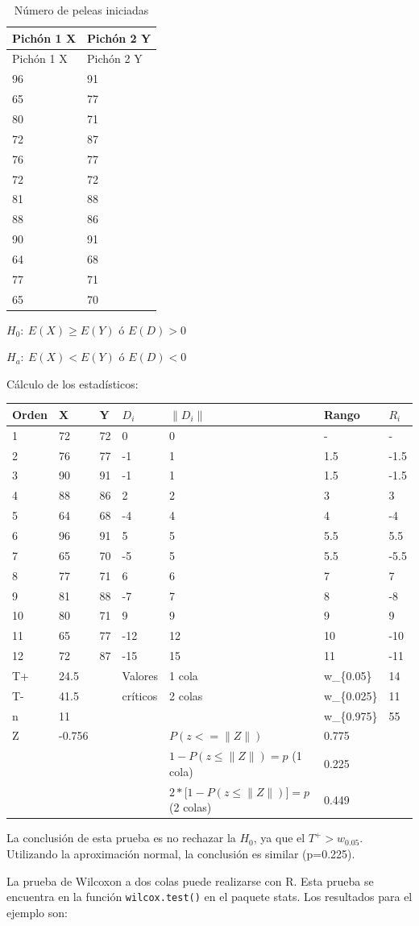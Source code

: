 \documentclass[]{book}
\theoremstyle{definition}
\theoremstyle{definition}
\theoremstyle{definition}
\theoremstyle{remark}
\begin{document}
\begin{longtable}[]{@{}ll@{}}
\caption{\label{tab:peleas} Número de peleas iniciadas}\tabularnewline
\toprule
Pichón 1 X & Pichón 2 Y\tabularnewline
\midrule
\endfirsthead
\toprule
Pichón 1 X & Pichón 2 Y\tabularnewline
\midrule
\endhead
96 & 91\tabularnewline
65 & 77\tabularnewline
80 & 71\tabularnewline
72 & 87\tabularnewline
76 & 77\tabularnewline
72 & 72\tabularnewline
81 & 88\tabularnewline
88 & 86\tabularnewline
90 & 91\tabularnewline
64 & 68\tabularnewline
77 & 71\tabularnewline
65 & 70\tabularnewline
\bottomrule
\end{longtable}

\(H_{0}:\ E\left( X \right) \geq E(Y)\) ó \(E\left( D \right) > 0\)

\(H_{a}:\ E\left( X \right) < E(Y)\) ó \(E\left( D \right) < 0\)

Cálculo de los estadísticos:

\begin{longtable}[]{@{}lllllll@{}}
\toprule
Orden & X & Y & \(D_{i}\) & \(\|D_{i}\|\) & Rango &
\(R_{i}\)\tabularnewline
\midrule
\endhead
1 & 72 & 72 & 0 & 0 & - & -\tabularnewline
2 & 76 & 77 & -1 & 1 & 1.5 & -1.5\tabularnewline
3 & 90 & 91 & -1 & 1 & 1.5 & -1.5\tabularnewline
4 & 88 & 86 & 2 & 2 & 3 & 3\tabularnewline
5 & 64 & 68 & -4 & 4 & 4 & -4\tabularnewline
6 & 96 & 91 & 5 & 5 & 5.5 & 5.5\tabularnewline
7 & 65 & 70 & -5 & 5 & 5.5 & -5.5\tabularnewline
8 & 77 & 71 & 6 & 6 & 7 & 7\tabularnewline
9 & 81 & 88 & -7 & 7 & 8 & -8\tabularnewline
10 & 80 & 71 & 9 & 9 & 9 & 9\tabularnewline
11 & 65 & 77 & -12 & 12 & 10 & -10\tabularnewline
12 & 72 & 87 & -15 & 15 & 11 & -11\tabularnewline
T+ & 24.5 & & Valores & 1 cola & w\_\{0.05\} & 14\tabularnewline
T- & 41.5 & & críticos & 2 colas & w\_\{0.025\} & 11\tabularnewline
n & 11 & & & & w\_\{0.975\} & 55\tabularnewline
Z & -0.756 & & & \(P(z < = \|Z\|)\) & 0.775 &\tabularnewline
& & & & \(1 - P(z \leq \|Z\|) = p\) (1 cola) & 0.225 &\tabularnewline
& & & & \(2*\lbrack 1 - P(z \leq \|Z\|)\rbrack = p\) (2 colas) & 0.449
&\tabularnewline
\bottomrule
\end{longtable}

La conclusión de esta prueba es no rechazar la \(H_{0}\), ya que el
\(T^{+} > w_{0.05}\). Utilizando la aproximación normal, la conclusión
es similar (p=0.225).

La prueba de Wilcoxon a dos colas puede realizarse con R. Esta prueba se
encuentra en la función \texttt{wilcox.test()} en el paquete stats. Los
resultados para el ejemplo son:
\end{document}
